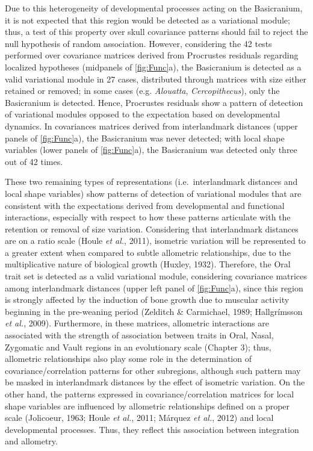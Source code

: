 \documentclass[12pt,twoside]{report}
\begin{document}
Due to this heterogeneity of developmental processes acting on the
Basicranium, it is not expected that this region would be detected as a
variational module; thus, a test of this property over skull covariance
patterns should fail to reject the null hypothesis of random
association. However, considering the 42 tests performed over covariance
matrices derived from Procrustes residuals regarding localized
hypotheses (midpanels of \autoref{fig:Func}a), the Basicranium is
detected as a valid variational module in 27 cases, distributed through
matrices with size either retained or removed; in some cases (e.g.
\emph{Alouatta}, \emph{Cercopithecus}), only the Basicranium is
detected. Hence, Procrustes residuals show a pattern of detection of
variational modules opposed to the expectation based on developmental
dynamics. In covariances matrices derived from interlandmark distances
(upper panels of \autoref{fig:Func}a), the Basicranium was never
detected; with local shape variables (lower panels of
\autoref{fig:Func}a), the Basicranium was detected only three out of 42
times.

These two remaining types of representations (i.e.~interlandmark
distances and local shape variables) show patterns of detection of
variational modules that are consistent with the expectations derived
from developmental and functional interactions, especially with respect
to how these patterns articulate with the retention or removal of size
variation. Considering that interlandmark distances are on a ratio scale
(Houle \emph{et al.}, 2011), isometric variation will be represented to
a greater extent when compared to subtle allometric relationships, due
to the multiplicative nature of biological growth (Huxley, 1932).
Therefore, the Oral trait set is detected as a valid variational module,
considering covariance matrices among interlandmark distances (upper
left panel of \autoref{fig:Func}a), since this region is strongly
affected by the induction of bone growth due to muscular activity
beginning in the pre-weaning period (Zelditch \& Carmichael, 1989;
Hallgrímsson \emph{et al.}, 2009). Furthermore, in these matrices,
allometric interactions are associated with the strength of association
between traits in Oral, Nasal, Zygomatic and Vault regions in an
evolutionary scale (Chapter 3); thus, allometric relationships also play
some role in the determination of covariance/correlation patterns for
other subregions, although such pattern may be masked in interlandmark
distances by the effect of isometric variation. On the other hand, the
patterns expressed in covariance/correlation matrices for local shape
variables are influenced by allometric relationships defined on a proper
scale (Jolicoeur, 1963; Houle \emph{et al.}, 2011; Márquez \emph{et
al.}, 2012) and local developmental processes. Thus, they reflect this
association between integration and allometry.
\end{document}
